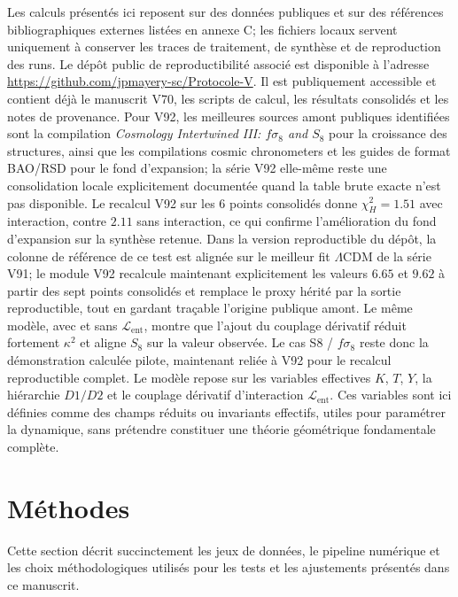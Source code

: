 \documentclass[11pt,a4paper]{article}
\newcommand{\kent}{\kappa} %
\newcommand{\Lent}{\mathcal{L}_{\mathrm{ent}}}
\begin{document}
Les calculs présentés ici reposent sur des données publiques et sur des références bibliographiques externes listées en annexe C; les fichiers locaux servent uniquement à conserver les traces de traitement, de synthèse et de reproduction des runs. Le dépôt public de reproductibilité associé est disponible à l'adresse \url{https://github.com/jpmayery-sc/Protocole-V}. Il est publiquement accessible et contient déjà le manuscrit V70, les scripts de calcul, les résultats consolidés et les notes de provenance. Pour V92, les meilleures sources amont publiques identifiées sont la compilation \emph{Cosmology Intertwined III: $f\sigma_8$ and $S_8$} pour la croissance des structures, ainsi que les compilations cosmic chronometers et les guides de format BAO/RSD pour le fond d'expansion; la série V92 elle-même reste une consolidation locale explicitement documentée quand la table brute exacte n'est pas disponible.
Le recalcul V92 sur les 6 points consolidés donne $\chi^2_H=1.51$ avec interaction, contre $2.11$ sans interaction, ce qui confirme l'amélioration du fond d'expansion sur la synthèse retenue.
Dans la version reproductible du dépôt, la colonne de référence de ce test est alignée sur le meilleur fit $\Lambda$CDM de la série V91; le module V92 recalcule maintenant explicitement les valeurs $6.65$ et $9.62$ à partir des sept points consolidés et remplace le proxy hérité par la sortie reproductible, tout en gardant traçable l'origine publique amont.
Le même modèle, avec et sans $\Lent$, montre que l'ajout du couplage dérivatif réduit fortement $\kent^2$ et aligne $S_8$ sur la valeur observée. Le cas S8 / $f\sigma_8$ reste donc la démonstration calculée pilote, maintenant reliée à V92 pour le recalcul reproductible complet.
Le modèle repose sur les variables effectives $K$, $T$, $Y$, la hiérarchie $D1/D2$ et le couplage dérivatif d'interaction $\Lent$. Ces variables sont ici définies comme des champs réduits ou invariants effectifs, utiles pour paramétrer la dynamique, sans prétendre constituer une théorie géométrique fondamentale complète.

\section{Méthodes}
\label{sec:methods}
Cette section décrit succinctement les jeux de données, le pipeline numérique et les choix méthodologiques utilisés pour les tests et les ajustements présentés dans ce manuscrit.
\end{document}
